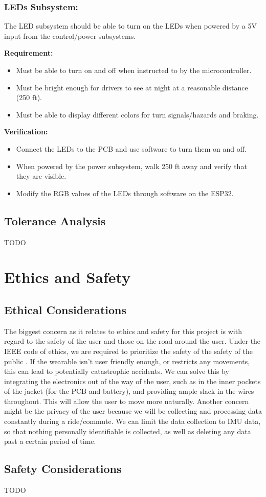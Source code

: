 \documentclass[12pt]{article}
\begin{document}
\subsubsection{LEDs Subsystem:} 
The LED subsystem should be able to turn on the LEDs when powered by a 5V input from the control/power subsystems.

\textbf{Requirement:} 
\begin{itemize}
    \item Must be able to turn on and off when instructed to by the microcontroller.
    \item Must be bright enough for drivers to see at night at a reasonable distance (250 ft).
    \item Must be able to display different colors for turn signals/hazards and braking.
\end{itemize}

\textbf{Verification:}
\begin{itemize}
    \item Connect the LEDs to the PCB and use software to turn them on and off.
    \item When powered by the power subsystem, walk 250 ft away and verify that they are visible.
    \item Modify the RGB values of the LEDs through software on the ESP32.
\end{itemize}

\subsection{Tolerance Analysis}
TODO

\section{Ethics and Safety}
\subsection{Ethical Considerations}
The biggest concern as it relates to ethics and safety for 
this project is with regard to the safety of the user and 
those on the road around the user. Under the IEEE code of 
ethics, we are required to prioritize the safety of the 
safety of the public \cite{IEEEethics2024}. If the wearable isn’t user
 friendly enough, or restricts any movements, this can lead 
 to potentially catastrophic accidents. We can solve this by 
 integrating the electronics out of the way of the user, 
 such as in the inner pockets of the jacket (for the PCB 
 and battery), and providing ample slack in the wires 
 throughout. This will allow the user to move more naturally.
  Another concern might be the privacy of the user \cite{IEEEethics2024}
   because we will be collecting and processing data constantly 
   during a ride/commute. We can limit the data collection to 
   IMU data, so that nothing personally identifiable is
    collected, as well as deleting any data past a certain 
    period of time. 




\subsection{Safety Considerations}
TODO

\cite{CFR571_108}


\end{document}
